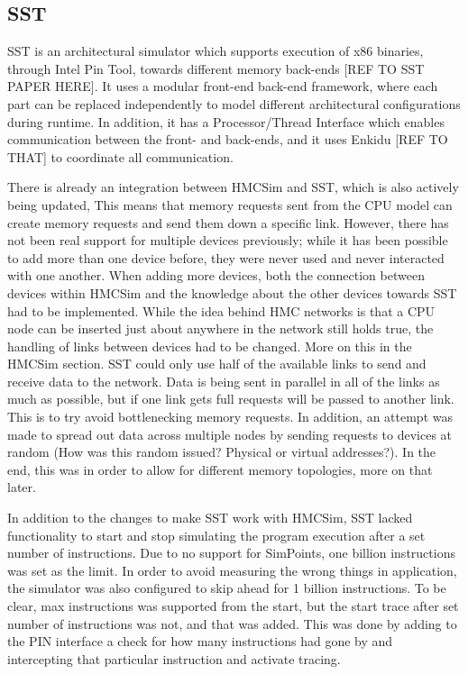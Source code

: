 \subsection{SST}
SST is an architectural simulator which supports execution of x86 binaries, through Intel Pin Tool, towards different memory back-ends [REF TO SST PAPER HERE]. It uses a modular front-end back-end framework, where each part can be replaced independently to model different architectural configurations during runtime. In addition, it has a Processor/Thread Interface which enables communication between the front- and back-ends, and it uses Enkidu [REF TO THAT] to coordinate all communication. 

There is already an integration between HMCSim and SST, which is also actively being updated, This means that memory requests sent from the CPU model can create memory requests and send them down a specific link. However, there has not been real support for multiple devices previously; while it has been possible to add more than one device before, they were never used and never interacted with one another. When adding more devices, both the connection between devices within HMCSim and the knowledge about the other devices towards SST had to be implemented. While the idea behind HMC networks is that a CPU node can be inserted just about anywhere in the network still holds true, the handling of links between devices had to be changed. More on this in the HMCSim section. SST could only use half of the available links to send and receive data to the network. Data is being sent in parallel in all of the links as much as possible, but if one link gets full requests will be passed to another link. This is to try avoid bottlenecking memory requests. In addition, an attempt was made to spread out data across multiple nodes by sending requests to devices at random (How was this random issued? Physical or virtual addresses?). In the end, this was in order to allow for different memory topologies, more on that later. 

In addition to the changes to make SST work with HMCSim, SST lacked functionality to start and stop simulating the program execution after a set number of instructions. Due to no support for SimPoints, one billion instructions was set as the limit. In order to avoid measuring the wrong things in application, the simulator was also configured to skip ahead for 1 billion instructions. To be clear, max instructions was supported from the start, but the start trace after set number of instructions was not, and that was added. This was done by adding to the PIN interface a check for how many instructions had gone by and intercepting that particular instruction and activate tracing. 

